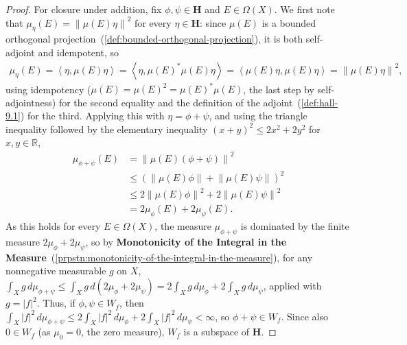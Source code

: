 \begin{proof}
For closure under addition, fix $\phi, \psi \in \mathbf{H}$ and $E \in \Omega(X)$. We first note that $\mu_\eta(E) = \left\| \mu(E)\eta \right\|^2$ for every $\eta \in \mathbf{H}$: since $\mu(E)$ is a bounded orthogonal projection~(\ref{def:bounded-orthogonal-projection}), it is both self-adjoint and idempotent, so
\begin{align}
    \mu_\eta(E) = \left< \eta, \mu(E)\eta \right> = \left< \eta, \mu(E)^*\mu(E)\eta \right> = \left< \mu(E)\eta, \mu(E)\eta \right> = \left\| \mu(E)\eta \right\|^2,
\end{align}
using idempotency ($\mu(E) = \mu(E)^2 = \mu(E)^*\mu(E)$, the last step by self-adjointness) for the second equality and the definition of the adjoint~(\ref{def:hall-9.1}) for the third. Applying this with $\eta = \phi+\psi$, and using the triangle inequality followed by the elementary inequality $(x+y)^2 \le 2x^2 + 2y^2$ for $x, y \in \mathbb{R}$,
\begin{align}
    \mu_{\phi+\psi}(E) &= \left\| \mu(E)(\phi + \psi) \right\|^2 \\
                       &\le \left( \left\| \mu(E)\phi \right\| + \left\| \mu(E)\psi \right\| \right)^2 \\
                       &\le 2 \left\| \mu(E)\phi \right\|^2 + 2 \left\| \mu(E)\psi \right\|^2 \\
                       &= 2\mu_\phi(E) + 2\mu_\psi(E).
\end{align}
As this holds for every $E \in \Omega(X)$, the measure $\mu_{\phi+\psi}$ is dominated by the finite measure $2\mu_\phi + 2\mu_\psi$, so by \textbf{Monotonicity of the Integral in the Measure}~(\ref{prpstn:monotonicity-of-the-integral-in-the-measure}), for any nonnegative measurable $g$ on $X$, $\int_X g \, d\mu_{\phi+\psi} \le \int_X g \, d(2\mu_\phi + 2\mu_\psi) = 2\int_X g \, d\mu_\phi + 2\int_X g \, d\mu_\psi$, applied with $g = \lvert f \rvert^2$. Thus, if $\phi, \psi \in W_f$, then $\int_X \lvert f \rvert^2 \, d\mu_{\phi+\psi} \le 2\int_X \lvert f \rvert^2 \, d\mu_\phi + 2\int_X \lvert f \rvert^2 \, d\mu_\psi < \infty$, so $\phi + \psi \in W_f$. Since also $0 \in W_f$ (as $\mu_0 = 0$, the zero measure), $W_f$ is a subspace of $\mathbf{H}$.


\end{proof}
